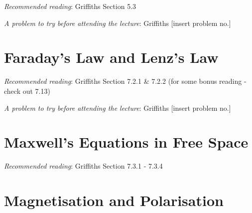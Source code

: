 \documentclass[
  letterpaper,
  DIV=11,
  numbers=noendperiod]{scrreprt}
\begin{document}
\newcommand{\l}{\mathrm{\mathbf{l}}}
\newcommand{\E}{\mathrm{\mathbf{E}}}
\newcommand{\F}{\mathrm{\mathbf{F}}}
\newcommand{\r}{\mathrm{\mathbf{r}}}

\newcommand{\x}{\mathrm{\mathbf{x}}}
\newcommand{\y}{\mathrm{\mathbf{y}}}
\newcommand{\z}{\mathrm{\mathbf{z}}}

\emph{Recommended reading}: Griffiths Section 5.3

\emph{A problem to try before attending the lecture}: Griffiths
{[}insert problem no.{]}


\chapter{Faraday's Law and Lenz's Law}\label{faradays-law-and-lenzs-law}

\newcommand{\l}{\mathrm{\mathbf{l}}}
\newcommand{\E}{\mathrm{\mathbf{E}}}
\newcommand{\F}{\mathrm{\mathbf{F}}}
\newcommand{\r}{\mathrm{\mathbf{r}}}

\newcommand{\x}{\mathrm{\mathbf{x}}}
\newcommand{\y}{\mathrm{\mathbf{y}}}
\newcommand{\z}{\mathrm{\mathbf{z}}}

\emph{Recommended reading}: Griffiths Section 7.2.1 \& 7.2.2 (for some
bonus reading - check out 7.13)

\emph{A problem to try before attending the lecture}: Griffiths
{[}insert problem no.{]}


\chapter{Maxwell's Equations in Free
Space}\label{maxwells-equations-in-free-space}

\newcommand{\l}{\mathrm{\mathbf{l}}}
\newcommand{\E}{\mathrm{\mathbf{E}}}
\newcommand{\F}{\mathrm{\mathbf{F}}}
\newcommand{\r}{\mathrm{\mathbf{r}}}

\newcommand{\x}{\mathrm{\mathbf{x}}}
\newcommand{\y}{\mathrm{\mathbf{y}}}
\newcommand{\z}{\mathrm{\mathbf{z}}}

\emph{Recommended reading}: Griffiths Section 7.3.1 - 7.3.4


\chapter{Magnetisation and
Polarisation}\label{magnetisation-and-polarisation}
\end{document}
